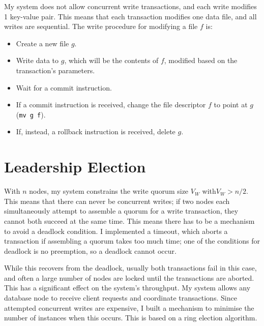 \documentclass[12pt,a4paper,twoside,openright]{report}
\begin{document}
My system does not allow concurrent write transactions, and each write modifies 1 key-value pair. This means that each transaction modifies one data file, and all writes are sequential. The write procedure for modifying a file $f$ is:

\begin{itemize}
\item
Create a new file $g$.

\item
Write data to $g$, which will be the contents of $f$, modified based on the transaction's parameters.

\item
Wait for a commit instruction.

\item
If a commit instruction is received, change the file descriptor $f$ to point at $g$ (\verb|mv g f|).

\item
If, instead, a rollback instruction is received, delete $g$.

\end{itemize}




\section{Leadership Election}

With $n$ nodes, my system constrains the write quorum size $V_W$ with$V_W > n / 2$. This means that there can never be concurrent writes; if two nodes each simultaneously attempt to assemble a quorum for a write transaction, they cannot both succeed at the same time. This means there has to be a mechanism to avoid a deadlock condition. I implemented a timeout, which aborts a transaction if assembling a quorum takes too much time; one of the conditions for deadlock is no preemption, so a deadlock cannot occur.

While this recovers from the deadlock, usually both transactions fail in this case, and often a large number of nodes are locked until the transactions are aborted. This has a significant effect on the system's throughput. My system allows any database node to receive client requests and coordinate transactions. Since attempted concurrent writes are expensive, I built a mechanism to minimise the number of instances when this occurs. This is based on a ring election algorithm.
\end{document}
